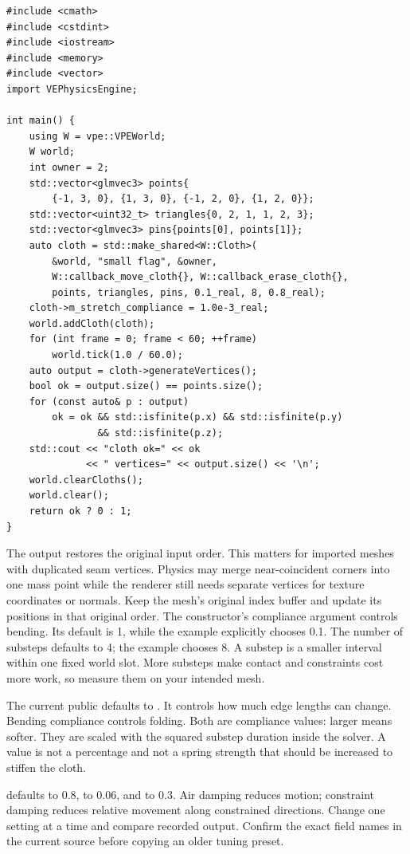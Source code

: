 \documentclass[11pt,a4paper]{article}
\begin{document}
\begin{lstlisting}
#include <cmath>
#include <cstdint>
#include <iostream>
#include <memory>
#include <vector>
import VEPhysicsEngine;

int main() {
    using W = vpe::VPEWorld;
    W world;
    int owner = 2;
    std::vector<glmvec3> points{
        {-1, 3, 0}, {1, 3, 0}, {-1, 2, 0}, {1, 2, 0}};
    std::vector<uint32_t> triangles{0, 2, 1, 1, 2, 3};
    std::vector<glmvec3> pins{points[0], points[1]};
    auto cloth = std::make_shared<W::Cloth>(
        &world, "small flag", &owner,
        W::callback_move_cloth{}, W::callback_erase_cloth{},
        points, triangles, pins, 0.1_real, 8, 0.8_real);
    cloth->m_stretch_compliance = 1.0e-3_real;
    world.addCloth(cloth);
    for (int frame = 0; frame < 60; ++frame)
        world.tick(1.0 / 60.0);
    auto output = cloth->generateVertices();
    bool ok = output.size() == points.size();
    for (const auto& p : output)
        ok = ok && std::isfinite(p.x) && std::isfinite(p.y)
                && std::isfinite(p.z);
    std::cout << "cloth ok=" << ok
              << " vertices=" << output.size() << '\n';
    world.clearCloths();
    world.clear();
    return ok ? 0 : 1;
}
\end{lstlisting}
The output restores the original input order. This matters for imported meshes with duplicated seam vertices. Physics may merge near-coincident corners into one mass point while the renderer still needs separate vertices for texture coordinates or normals. Keep the mesh's original index buffer and update its positions in that original order.
The constructor's compliance argument controls bending. Its default is 1, while the example explicitly chooses 0.1. The number of substeps defaults to 4; the example chooses 8. A substep is a smaller interval within one fixed world slot. More substeps make contact and constraints cost more work, so measure them on your intended mesh.

The current public  defaults to . It controls how much edge lengths can change. Bending compliance controls folding. Both are compliance values: larger means softer. They are scaled with the squared substep duration inside the solver. A value is not a percentage and not a spring strength that should be increased to stiffen the cloth.

 defaults to 0.8,  to 0.06, and  to 0.3. Air damping reduces motion; constraint damping reduces relative movement along constrained directions. Change one setting at a time and compare recorded output. Confirm the exact field names in the current source before copying an older tuning preset.
\end{document}
